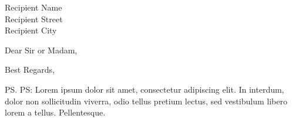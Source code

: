 \documentclass[%
	backaddress=off,
	fromalign=locationright,
	fromname,
	fromaddress,
	fromphone,
	fromemail,
]{scrlttr2}
\begin{document}
\begin{letter}{%
	Recipient Name\\
	Recipient Street\\
	Recipient City
}
\opening{Dear Sir or Madam,}


\lipsum[1]

\closing{Best Regards,}

\ps PS: Lorem ipsum dolor sit amet, consectetur adipiscing elit. In interdum, dolor non sollicitudin viverra, odio tellus pretium lectus, sed vestibulum libero lorem a tellus. Pellentesque.

\end{letter}
\end{document}
